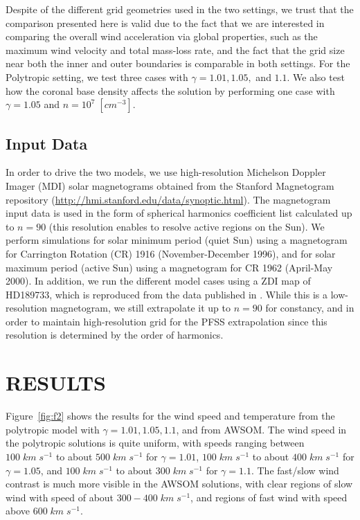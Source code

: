 \documentclass[apj]{emulateapj}
\begin{document}
Despite of the different grid geometries used in the two settings, we trust that the comparison presented here is valid due to the fact that we are interested in comparing the overall wind acceleration via global properties, such as the maximum wind velocity and total mass-loss rate, and the fact that the grid size near both the inner and outer boundaries is comparable in both settings. For the Polytropic setting, we test three cases with $\gamma=1.01,1.05,$ and $1.1$. We also test how the coronal base density affects the solution by performing one case with $\gamma=1.05$ and $n=10^7\;[cm^{-3}]$.

\subsection{Input Data}
\label{sec:InputData}

In order to drive the two models, we use high-resolution Michelson Doppler Imager (MDI) solar magnetograms obtained from the Stanford Magnetogram repository (\url{http://hmi.stanford.edu/data/synoptic.html}). The magnetogram input data is used in the form of spherical harmonics coefficient list calculated up to $n=90$ (this resolution enables to resolve active regions on the Sun). We perform simulations for solar minimum period (quiet Sun) using a  magnetogram for Carrington Rotation (CR) 1916 (November-December 1996), and for solar maximum period (active Sun) using a magnetogram for CR 1962 (April-May 2000). In addition, we run the different model cases using a ZDI map of HD189733, which is reproduced from the data published in \cite{Fares10}. While this is a low-resolution magnetogram, we still extrapolate it up to $n=90$ for constancy, and in order to maintain high-resolution grid for the PFSS extrapolation since this resolution is determined by the order of harmonics.


\section{RESULTS}
\label{sec:Results}

Figure~\ref{fig:f2} shows the results for the wind speed and temperature from the polytropic model with $\gamma=1.01,1.05,1.1$, and from AWSOM. The wind speed in the polytropic solutions is quite uniform, with speeds ranging between $100\;km\;s^{-1}$ to about $500\;km\;s^{-1}$ for $\gamma=1.01$, $100\;km\;s^{-1}$ to about $400\;km\;s^{-1}$ for $\gamma=1.05$, and $100\;km\;s^{-1}$ to about $300\;km\;s^{-1}$ for $\gamma=1.1$. The fast/slow wind contrast is much more visible in the AWSOM solutions, with clear regions of slow wind with speed of about $300-400\;km\;s^{-1}$, and regions of fast wind with speed above $600\;km\;s^{-1}$.
\end{document}
